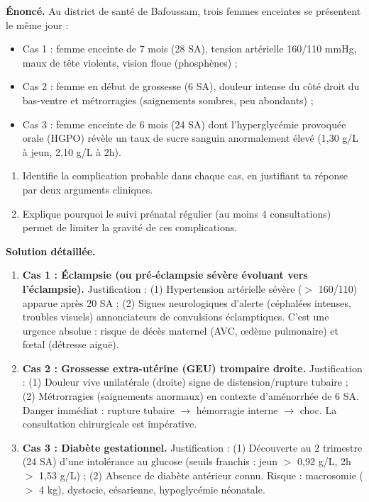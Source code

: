\documentclass[11pt]{article}
\begin{document}
\begin{exoresolu}
\textbf{Énoncé.} Au district de santé de Bafoussam, trois femmes enceintes se présentent le même jour :
\begin{itemize}
\item Cas 1 : femme enceinte de 7 mois (28 SA), tension artérielle 160/110 mmHg, maux de tête violents, vision floue (phosphènes) ;
\item Cas 2 : femme en début de grossesse (6 SA), douleur intense du côté droit du bas-ventre et métrorragies (saignements sombres, peu abondants) ;
\item Cas 3 : femme enceinte de 6 mois (24 SA) dont l'hyperglycémie provoquée orale (HGPO) révèle un taux de sucre sanguin anormalement élevé (1,30 g/L à jeun, 2,10 g/L à 2h).
\end{itemize}
\begin{enumerate}
\item Identifie la complication probable dans chaque cas, en justifiant ta réponse par deux arguments cliniques.
\item Explique pourquoi le suivi prénatal régulier (au moins 4 consultations) permet de limiter la gravité de ces complications.
\end{enumerate}
\tcblower
\textbf{Solution détaillée.}
\begin{enumerate}
\item \textbf{Cas 1 : Éclampsie (ou pré-éclampsie sévère évoluant vers l'éclampsie).} 
Justification : (1) Hypertension artérielle sévère ($>$ 160/110) apparue après 20 SA ; (2) Signes neurologiques d'alerte (céphalées intenses, troubles visuels) annonciateurs de convulsions éclamptiques. C'est une urgence absolue : risque de décès maternel (AVC, œdème pulmonaire) et f\oe tal (détresse aiguë).
\item \textbf{Cas 2 : Grossesse extra-utérine (GEU) trompaire droite.} 
Justification : (1) Douleur vive unilatérale (droite) signe de distension/rupture tubaire ; (2) Métrorragies (saignements anormaux) en contexte d'aménorrhée de 6 SA. Danger immédiat : rupture tubaire $\rightarrow$ hémorragie interne $\rightarrow$ choc. La consultation chirurgicale est impérative.
\item \textbf{Cas 3 : Diabète gestationnel.} 
Justification : (1) Découverte au 2\ieme{} trimestre (24 SA) d'une intolérance au glucose (seuils franchis : jeun $>$ 0,92 g/L, 2h $>$ 1,53 g/L) ; (2) Absence de diabète antérieur connu. Risque : macrosomie ($>$ 4 kg), dystocie, césarienne, hypoglycémie néonatale.

\end{enumerate}
\end{exoresolu}
\end{document}
